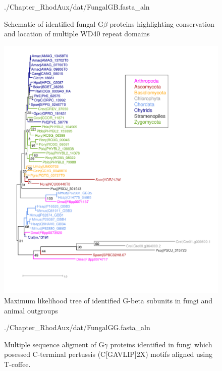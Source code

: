 \begin{figure}[hb]
  \centering
  \begin{texshade}{./Chapter_RhodAux/dat/FungalGB.fasta_aln}
    \showlegend
  \end{texshade}
  \caption[G$\beta$ WD40 repeats]{Schematic of identified fungal G$\beta$ proteins highlighting conservation and location of multiple WD40 repeat domains}
  \label{fig:ChRhodA_GbetaStruct}
\end{figure}

\begin{figure}[hb]
  \centering
  \includegraphics{./Chapter_RhodAux/img/Gbeta_tree.png}
  \caption[Gbeta tree]{Maximum likelihood tree of identified G-beta subunits in fungi and animal outgroups}
  \label{fig:ChRhodA_GbetaTree}
\end{figure}

\begin{figure}[hb]
  \centering
  \begin{texshade}{./Chapter_RhodAux/dat/FungalGG.fasta_aln}
    \hidenumbering
  \end{texshade}
  \caption[Galpha MSA]{Multiple sequence aligment of G$\gamma$ proteins identified in fungi which posessed C-terminal pertussis (C[GAVLIP]{2}X) motifs aligned using T-coffee.}
  \label{fig:ChRhodA_ggMSA}
\end{figure}

